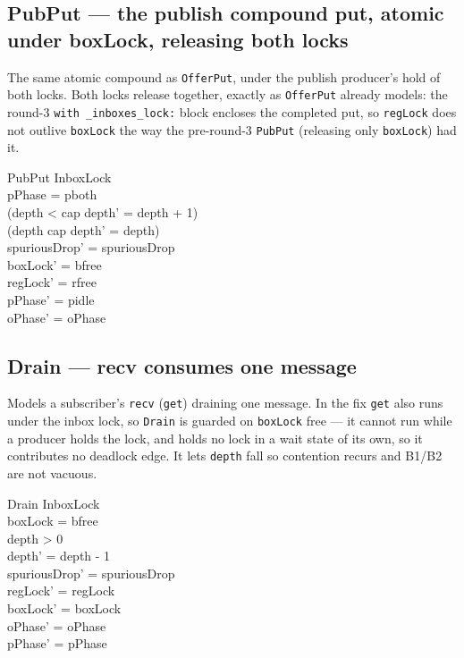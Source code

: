 \documentclass[a4paper,10pt,fleqn]{article}
\begin{document}
\subsection{PubPut --- the publish compound put, atomic under boxLock, releasing both locks}

The same atomic compound as \texttt{OfferPut}, under the publish producer's
hold of both locks. Both locks release together, exactly as \texttt{OfferPut}
already models: the round-3 \texttt{with \_inboxes\_lock:} block encloses the
completed put, so \texttt{regLock} does not outlive \texttt{boxLock} the way
the pre-round-3 \texttt{PubPut} (releasing only \texttt{boxLock}) had it.

\begin{schema}{PubPut}
  \Delta InboxLock \\
\where
  pPhase = pboth \\
  (depth < cap \implies depth' = depth + 1) \\
  (depth \geq cap \implies depth' = depth) \\
  spuriousDrop' = spuriousDrop \\
  boxLock' = bfree \\
  regLock' = rfree \\
  pPhase' = pidle \\
  oPhase' = oPhase
\end{schema}

\subsection{Drain --- recv consumes one message}

Models a subscriber's \texttt{recv} (\texttt{get}) draining one message. In the
fix \texttt{get} also runs under the inbox lock, so \texttt{Drain} is guarded on
\texttt{boxLock} free --- it cannot run while a producer holds the lock, and
holds no lock in a wait state of its own, so it contributes no deadlock edge. It
lets \texttt{depth} fall so contention recurs and B1/B2 are not vacuous.

\begin{schema}{Drain}
  \Delta InboxLock \\
\where
  boxLock = bfree \\
  depth > 0 \\
  depth' = depth - 1 \\
  spuriousDrop' = spuriousDrop \\
  regLock' = regLock \\
  boxLock' = boxLock \\
  oPhase' = oPhase \\
  pPhase' = pPhase
\end{schema}
\end{document}
